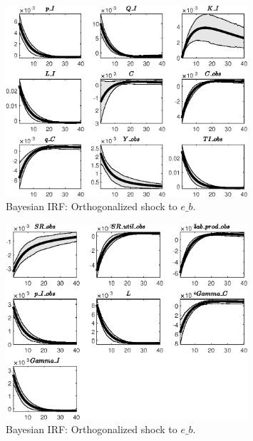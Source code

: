 \begin{figure}[H]
\centering 
\includegraphics[width=0.80\textwidth]{directed_search/Output/directed_search_Bayesian_IRF_e_b_1}
\caption{Bayesian IRF: Orthogonalized shock to $e\_b$.}
\label{Fig:BayesianIRF:e_b:1}
\end{figure}
 
\begin{figure}[H]
\centering 
\includegraphics[width=0.80\textwidth]{directed_search/Output/directed_search_Bayesian_IRF_e_b_2}
\caption{Bayesian IRF: Orthogonalized shock to $e\_b$.}
\label{Fig:BayesianIRF:e_b:2}
\end{figure}
 
